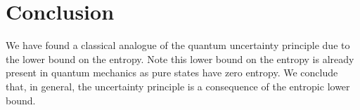\documentclass{techbrief}
\begin{document}
\section{Conclusion}

We have found a classical analogue of the quantum uncertainty principle due to the lower bound on the entropy. Note this lower bound on the entropy is already present in quantum mechanics as pure states have zero entropy. We conclude that, in general, the uncertainty principle is a consequence of the entropic lower bound.
\end{document}
